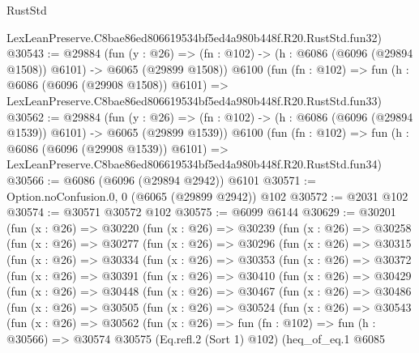 \begin{lexlean}{RustStd}
\begin{coremodule}
    LexLeanPreserve.C8bae86ed806619534bf5ed4a980b448f.R20.RustStd.fun32)
@30543 := @29884
    (fun (y : @26) =>
    (fn : @102) -> (h : @6086 (@6096 (@29894 @1508)) @6101) -> @6065 (@29899 @1508))
    @6100
    (fun (fn : @102) =>
    fun (h : @6086 (@6096 (@29908 @1508)) @6101) =>
    LexLeanPreserve.C8bae86ed806619534bf5ed4a980b448f.R20.RustStd.fun33)
@30562 := @29884
    (fun (y : @26) =>
    (fn : @102) -> (h : @6086 (@6096 (@29894 @1539)) @6101) -> @6065 (@29899 @1539))
    @6100
    (fun (fn : @102) =>
    fun (h : @6086 (@6096 (@29908 @1539)) @6101) =>
    LexLeanPreserve.C8bae86ed806619534bf5ed4a980b448f.R20.RustStd.fun34)
@30566 := @6086 (@6096 (@29894 @2942)) @6101
@30571 := Option.noConfusion.{0, 0} (@6065 (@29899 @2942)) @102
@30572 := @2031 @102
@30574 := @30571 @30572 @102
@30575 := @6099 @6144
@30629 := @30201
    (fun (x : @26) =>
    @30220
      (fun (x : @26) =>
      @30239
        (fun (x : @26) =>
        @30258
          (fun (x : @26) =>
          @30277
            (fun (x : @26) =>
            @30296
              (fun (x : @26) =>
              @30315
                (fun (x : @26) =>
                @30334
                  (fun (x : @26) =>
                  @30353
                    (fun (x : @26) =>
                    @30372
                      (fun (x : @26) =>
                      @30391
                        (fun (x : @26) =>
                        @30410
                          (fun (x : @26) =>
                          @30429
                            (fun (x : @26) =>
                            @30448
                              (fun (x : @26) =>
                              @30467
                                (fun (x : @26) =>
                                @30486
                                  (fun (x : @26) =>
                                  @30505
                                    (fun (x : @26) =>
                                    @30524
                                      (fun (x : @26) =>
                                      @30543
                                        (fun (x : @26) =>
                                        @30562
                                          (fun (x : @26) =>
                                          fun (fn : @102) =>
                                          fun (h : @30566) =>
                                          @30574
                                            @30575
                                            (Eq.refl.{2} (Sort 1) @102)
                                            (heq_of_eq.{1}
                                              @6085

\end{coremodule}
\end{lexlean}
